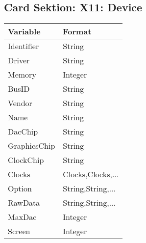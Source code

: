 \subsection{Card Sektion: X11: Device}
\begin{tabular}[h]{|p{5cm}|p{7cm}|}
 \hline
 \textbf{Variable}     & \textbf{Format}        \\
 \hline
 Identifier      & String                             \\
 Driver          & String                             \\
 Memory          & Integer                            \\
 BusID           & String                             \\
 Vendor          & String                             \\
 Name            & String                             \\
 DacChip         & String                             \\
 GraphicsChip    & String                             \\
 ClockChip       & String                             \\
 Clocks          & Clocks,Clocks,...                  \\
 Option          & String,String,...                  \\
 RawData         & String,String,...                  \\
 MaxDac          & Integer                            \\
 Screen          & Integer                            \\
 \hline
\end{tabular}


